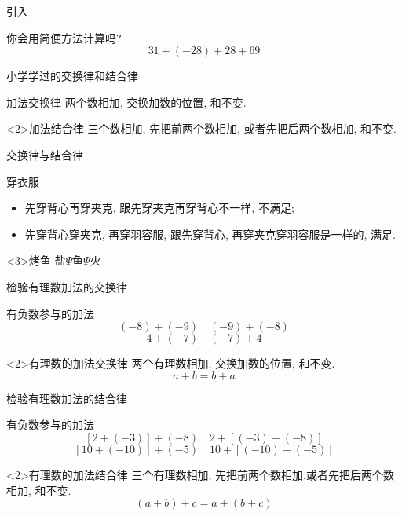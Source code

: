 \documentclass{beamer}
\begin{document}
\kaishu\Large
\def\hspacea{\hspace*{1.5in}}
\begin{frame}{引入}
  \begin{exampleblock}{你会用简便方法计算吗?}
    $$31+(-28)+28+69$$
  \end{exampleblock}
\end{frame}

\begin{frame}{小学学过的交换律和结合律}
  \begin{block}{加法交换律}
    两个数相加, 交换加数的位置, 和不变. 
  \end{block}
  \begin{alertblock}<2>{加法结合律}
    三个数相加, 先把前两个数相加, 或者先把后两个数相加, 和不变. 
  \end{alertblock}
\end{frame}

\begin{frame}{交换律与结合律}
  \begin{block}{穿衣服}
    \begin{itemize}[<+->]
      \item 先穿背心再穿夹克, 跟先穿夹克再穿背心不一样, 不满足;
      \item 先穿背心穿夹克, 再穿羽容服, 跟先穿背心, 再穿夹克穿羽容服是一样的, 满足.
    \end{itemize}
  \end{block}
  \begin{exampleblock}<3>{烤鱼}
   \hspacea 盐$\Psi$鱼$\Psi$火  
  \end{exampleblock}
\end{frame}


\begin{frame}{检验有理数加法的交换律}
  \begin{block}{有负数参与的加法}
    $$(-8)+(-9)\quad (-9)+(-8)$$
    $$4+(-7)\quad (-7)+4$$
  \end{block}
  \begin{alertblock}<2>{有理数的加法交换律}
    两个有理数相加, 交换加数的位置, 和不变.
    $$a+b=b+a$$
  \end{alertblock}
\end{frame}

\begin{frame}{检验有理数加法的结合律}
  \begin{block}{有负数参与的加法}
    $$[2+(-3)]+(-8)\quad 2+[(-3)+(-8)]$$
    $$[10+(-10)]+(-5)\quad 10+[(-10)+(-5)]$$
  \end{block}
  \begin{alertblock}<2>{有理数的加法结合律}
    三个有理数相加, 先把前两个数相加,或者先把后两个数相加, 和不变.
    $$(a+b)+c=a+(b+c)$$
  \end{alertblock}
\end{frame}
\end{document}

